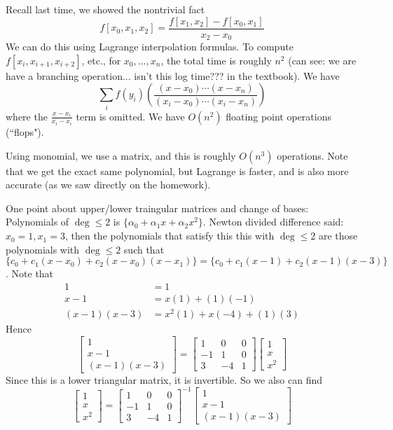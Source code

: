 \documentclass{article}
\theoremstyle{plain}
\theoremstyle{remark}
\begin{document}
Recall last time, we showed the nontrivial fact
\[
	f[x_0,x_1,x_2] = \frac{f[x_1,x_2] - f[x_0,x_1]}{x_2-x_0}
\]
We can do this using Lagrange interpolation formulas.
To compute $f[x_i,x_{i+1},x_{i+2}]$, etc., for $x_0,\dots,x_n$,
the total time is roughly $n^2$
(can see: we are have a branching operation... isn't this log time???
in the textbook).
We have
\[
	\sum_i f(y_i)\left(\frac{(x-x_0)\cdots(x-x_n)}{(x_i-x_0)\cdots(x_i-x_n)}\right)
\]
where the $\frac{x-x_i}{x_i-x_i}$ term is omitted.
We have $O(n^2)$ floating point operations (``flops").

Using monomial, we use a matrix, and this is roughly $O(n^3)$ operations.
Note that we get the exact same polynomial, but Lagrange is faster,
and is also more accurate (as we saw directly on the homework).

One point about upper/lower traingular matrices and change of bases:
Polynomials of $\deg \leq 2$ is $\{\alpha_0 + \alpha_1x + \alpha_2 x^2\}$.
Newton divided difference said: $x_0 = 1, x_1 = 3$,
then the polynomials that satisfy this this with $\deg \leq 2$
are those polynomials with $\deg \leq 2$ such that $\{c_0 + c_1(x-x_0) + c_2(x-x_0)(x-x_1)\}
= \{c_0 + c_1(x-1) + c_2(x-1)(x-3)\}$.
Note that
\begin{align*}
	1 &= 1\\
	x-1 &= x(1) + (1)(-1)\\
	(x-1)(x-3) &= x^2(1) + x(-4) + (1)(3)
\end{align*}
Hence
\[
	\begin{bmatrix} 1 \\ x-1 \\ (x-1)(x-3) \end{bmatrix}
	= \begin{bmatrix} 1 & 0 & 0\\ -1 & 1 & 0 \\ 3 & -4 & 1 \end{bmatrix}
	\begin{bmatrix} 1\\ x \\ x^2 \end{bmatrix}
\]
Since this is a lower triangular matrix, it is invertible.
So we also can find
\[
	\begin{bmatrix} 1\\ x \\ x^2 \end{bmatrix} =
	\begin{bmatrix} 1 & 0 & 0\\ -1 & 1 & 0 \\ 3 & -4 & 1 \end{bmatrix}^{-1}
	\begin{bmatrix} 1\\ x-1 \\ (x-1)(x-3) \end{bmatrix}
\]
\end{document}
